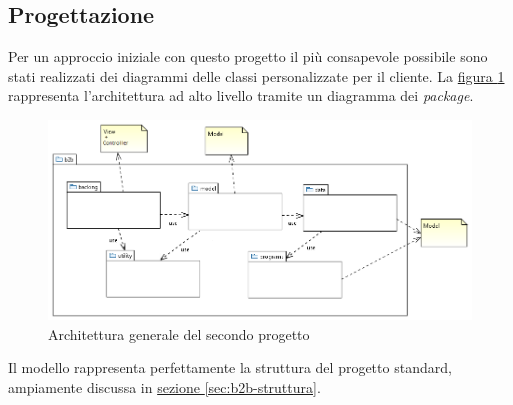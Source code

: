 \subsection{Progettazione}
Per un approccio iniziale con questo progetto il più consapevole possibile sono stati realizzati dei diagrammi delle classi personalizzate per il cliente. La \hyperref[fig:arch-p2]{figura \ref{fig:arch-p2}} rappresenta l'architettura ad alto livello tramite un diagramma dei \textit{package}.
\begin{figure}[H]
	\centering
	\includegraphics[width=\linewidth]{Immagini/p2/architettura.png}
	\caption{Architettura generale del secondo progetto}
	\label{fig:arch-p2}
\end{figure}
Il modello rappresenta perfettamente la struttura del progetto standard, ampiamente discussa in \hyperref[sec:b2b-struttura]{sezione \ref{sec:b2b-struttura}}. 



